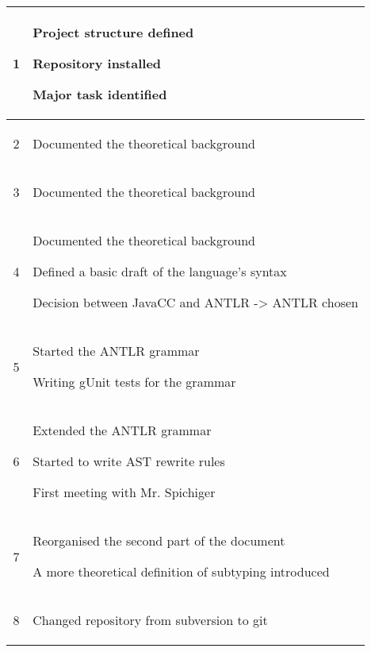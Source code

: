 \begin{center}
\begin{longtable}{|c|p{12cm}|}
1 & 
\begin{journal}
	\item Project structure defined
	\item Repository installed
	\item Major task identified
\end{journal}
\\ \hline
2 & 
\begin{journal}
	\item Documented the theoretical background
\end{journal}
\\ \hline
3 & 
\begin{journal}
	\item Documented the theoretical background
\end{journal}
\\ \hline
4 & 
\begin{journal}
	\item Documented the theoretical background
	\item Defined a basic draft of the language's syntax
	\item Decision between JavaCC and ANTLR -> ANTLR chosen
\end{journal}
\\ \hline
5 & 
\begin{journal}
	\item Started the ANTLR grammar
	\item Writing gUnit tests for the grammar
\end{journal}
\\ \hline
6 & 
\begin{journal}
	\item Extended the ANTLR grammar
	\item Started to write AST rewrite rules
	\item First meeting with Mr. Spichiger
\end{journal}
\\ \hline
7 & 
\begin{journal}
	\item Reorganised the second part of the document
	\item A more theoretical definition of subtyping introduced
\end{journal}
\\ \hline
8 & 
\begin{journal}
	\item Changed repository from subversion to git
\end{journal}
\\ \hline

\end{longtable}
\end{center}
